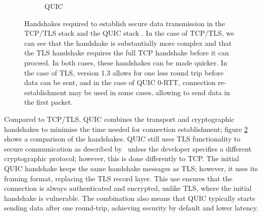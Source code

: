 \begin{figure}[ht]
\begin{center}
\begin{subfigure}[b]{0.45\textwidth}
            \caption{QUIC}
            \label{fig:handshakes:quic}
        \end{subfigure}
        \caption{Handshakes required to establish secure data transmission in the TCP/TLS stack  and the QUIC stack . In the case of TCP/TLS, we can see that the handshake is substantially more complex and that the TLS handshake requires the full TCP handshake before it can proceed. In both cases, these handshakes can be made quicker. In the case of TLS, version 1.3 allows for one less round trip before data can be sent, and in the case of QUIC 0-RTT, connection re-establishment may be used in some cases, allowing to send data in the first packet.}
        \label{fig:handshakes_comparison}
    \end{center}
\end{figure}

Compared to TCP/TLS, QUIC combines the transport and cryptographic handshakes to minimise the time needed for connection establishment; figure \ref{fig:handshakes_comparison} shows a comparison of the handshakes.
QUIC still uses TLS functionality to secure communication as described by~\citet{thomson_using_2021} unless the developer specifies a different cryptographic protocol; however, this is done differently to TCP.
The initial QUIC handshake keeps the same handshake messages as TLS; however, it uses its framing format, replacing the TLS record layer.
This use ensures that the connection is always authenticated and encrypted, unlike TLS, where the initial handshake is vulnerable.
The combination also means that QUIC typically starts sending data after one round-trip, achieving security by default and lower latency.
